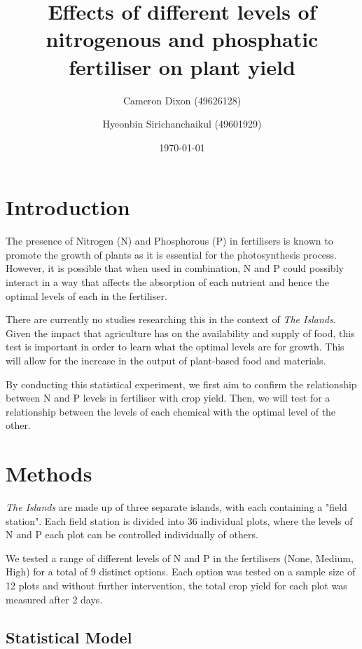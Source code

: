\documentclass[12pt]{article}
\title{Effects of different levels of nitrogenous and phosphatic fertiliser on plant yield}
\author{Cameron Dixon (49626128)}
\author{Hyeonbin Sirichanchaikul (49601929)}
\affil{The University of Queensland}
\date{\today}
\begin{document}
\maketitle

\section{Introduction}

The presence of Nitrogen (N) and Phosphorous (P) in fertilisers is known to promote the growth of plants as it is essential for the photosynthesis process. 
However, it is possible that when used in combination, N and P could possibly interact in a way that affects the absorption of each nutrient and hence the optimal levels of each in the fertiliser.

There are currently no studies researching this in the context of \textit{The Islands}.
Given the impact that agriculture has on the availability and supply of food, this test is important in order to learn what the optimal levels are for growth. This will allow for the increase in the output of plant-based food and materials.

By conducting this statistical experiment, we first aim to confirm the relationship between N and P levels in fertiliser with crop yield.
Then, we will test for a relationship between the levels of each chemical with the optimal level of the other.

\section{Methods}

\textit{The Islands} are made up of three separate islands, with each containing a "field station".
Each field station is divided into 36 individual plots, where the levels of N and P each plot can be controlled individually of others.

We tested a range of different levels of N and P in the fertilisers (None, Medium, High) for a total of 9 distinct options.
Each option was tested on a sample size of 12 plots and without further intervention, the total crop yield for each plot was measured after 2 days.

\subsection{Statistical Model}
\end{document}
